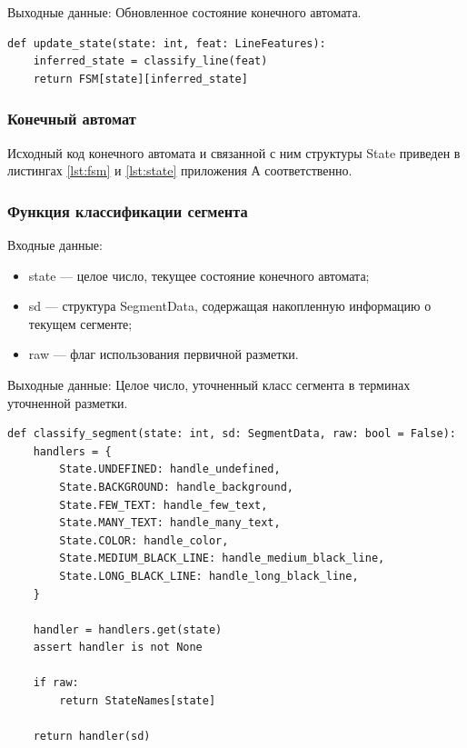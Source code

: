 Выходные данные: Обновленное состояние конечного автомата.

\begin{lstlisting}[caption={Функция обновления состояния конечного автомата}, label={}]
def update_state(state: int, feat: LineFeatures):
    inferred_state = classify_line(feat)
    return FSM[state][inferred_state]
\end{lstlisting}

\subsubsection*{Конечный автомат} %

Исходный код конечного автомата и связанной с ним структуры State приведен в листингах \ref{lst:fsm} и \ref{lst:state} приложения А соответственно.

\subsubsection{Функция классификации сегмента} %
Входные данные:
\begin{itemize}
    \item state --- целое число, текущее состояние конечного автомата;
    \item sd --- структура SegmentData, содержащая накопленную информацию о текущем сегменте;
    \item raw --- флаг использования первичной разметки.
\end{itemize}

Выходные данные: Целое число, уточненный класс сегмента в терминах уточненной разметки.

\begin{lstlisting}[caption={Функция классификации сегмента}, label={}]
def classify_segment(state: int, sd: SegmentData, raw: bool = False):
    handlers = {
        State.UNDEFINED: handle_undefined,
        State.BACKGROUND: handle_background,
        State.FEW_TEXT: handle_few_text,
        State.MANY_TEXT: handle_many_text,
        State.COLOR: handle_color,
        State.MEDIUM_BLACK_LINE: handle_medium_black_line,
        State.LONG_BLACK_LINE: handle_long_black_line,
    }

    handler = handlers.get(state)
    assert handler is not None

    if raw:
        return StateNames[state]

    return handler(sd)
\end{lstlisting}

